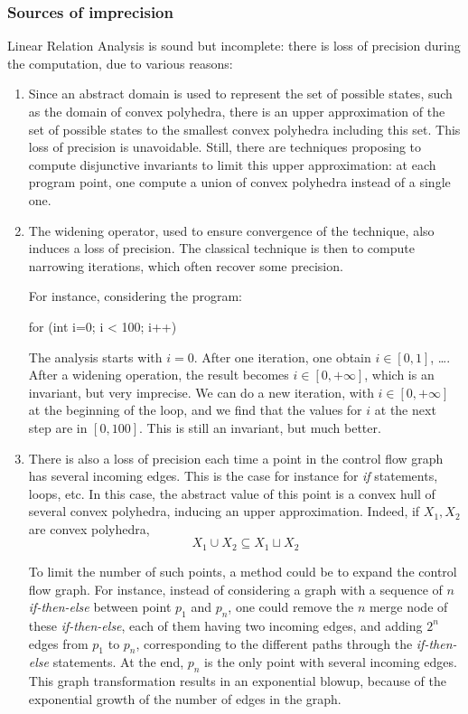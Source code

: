 \documentclass[a4paper,english,titlepage,11pt]{article}
\begin{document}
\subsubsection{Sources of imprecision}
 \label{multigraph}
Linear Relation Analysis is sound but incomplete: there is loss of precision
during the computation, due to various reasons:
\begin{enumerate}
\item Since an abstract domain is used to represent the set of possible states,
such as the domain of convex polyhedra, there is an upper approximation of the
set of possible states to the smallest convex polyhedra including this set. This
loss of precision is unavoidable. Still, there are techniques proposing to
compute disjunctive invariants \cite{GulwaniZ10} to limit this upper approximation: at each
program point, one compute a union of convex polyhedra instead of a single
one.
\item The widening operator, used to ensure convergence of the technique,
also induces a loss of precision. The classical technique is then to compute
narrowing iterations, which often recover some precision. 

For instance, considering the program:
\begin{C}
for (int i=0; i < 100; i++) {
}
\end{C}
The analysis starts with $i=0$. After one iteration, one obtain $i \in
[0,1]$, \dots. After a widening operation, the result becomes $i \in [0,
+\infty]$, which is an invariant, but very imprecise. We can do a new iteration,
with $i\in [0, +\infty]$ at the beginning of the loop, and we find that the
values for $i$ at the next step are in $[0, 100]$. This is still an invariant,
but much better.

\item There is also a loss of precision each time a point in the control flow
graph has several incoming edges. This is the case for instance for
\emph{if} statements, loops, etc. In this case, the abstract value of this point
is a convex hull of several convex polyhedra, inducing an upper approximation.
Indeed, if $X_1, X_2$ are convex polyhedra,
$$X_1 \cup X_2 \subseteq X_1 \sqcup X_2$$

To limit the number of such points, a method could be
to expand the control flow graph. For instance, instead of considering a graph
with a sequence of $n$ \emph{if-then-else} between point $p_1$ and $p_n$, one could remove the $n$ merge node
of these \emph{if-then-else}, each of them having two incoming edges, and adding 
$2^n$ edges from $p_1$ to $p_n$, corresponding to the different paths through
the \emph{if-then-else} statements. At the end, $p_n$ is the only point with
several incoming edges. This graph transformation results in an exponential
blowup, because of the exponential growth of the number of edges in the graph.
\end{enumerate}
\end{document}
